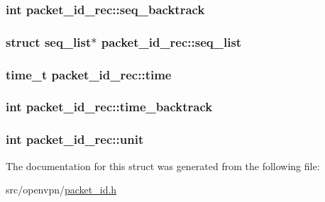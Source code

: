 \subsubsection[{seq\+\_\+backtrack}]{\setlength{\rightskip}{0pt plus 5cm}int packet\+\_\+id\+\_\+rec\+::seq\+\_\+backtrack}\label{structpacket__id__rec_a8d2bb1d55221ff514cffbd9d9801c78f}
\hypertarget{structpacket__id__rec_aedcc1edb752ff0a34eb11fb5fadcfd9a}{}
\subsubsection[{seq\+\_\+list}]{\setlength{\rightskip}{0pt plus 5cm}struct seq\+\_\+list$\ast$ packet\+\_\+id\+\_\+rec\+::seq\+\_\+list}\label{structpacket__id__rec_aedcc1edb752ff0a34eb11fb5fadcfd9a}
\hypertarget{structpacket__id__rec_a2ce095b775678e4cc3d4dfb9b0d316b0}{}
\subsubsection[{time}]{\setlength{\rightskip}{0pt plus 5cm}time\+\_\+t packet\+\_\+id\+\_\+rec\+::time}\label{structpacket__id__rec_a2ce095b775678e4cc3d4dfb9b0d316b0}
\hypertarget{structpacket__id__rec_abc36bfa9bd524c9990ed130b843de895}{}
\subsubsection[{time\+\_\+backtrack}]{\setlength{\rightskip}{0pt plus 5cm}int packet\+\_\+id\+\_\+rec\+::time\+\_\+backtrack}\label{structpacket__id__rec_abc36bfa9bd524c9990ed130b843de895}
\hypertarget{structpacket__id__rec_a5a7a032c5698f8052b9bae8bdf46bc0f}{}
\subsubsection[{unit}]{\setlength{\rightskip}{0pt plus 5cm}int packet\+\_\+id\+\_\+rec\+::unit}\label{structpacket__id__rec_a5a7a032c5698f8052b9bae8bdf46bc0f}


The documentation for this struct was generated from the following file\+:\begin{DoxyCompactItemize}
\item 
src/openvpn/\hyperlink{packet__id_8h}{packet\+\_\+id.\+h}\end{DoxyCompactItemize}
